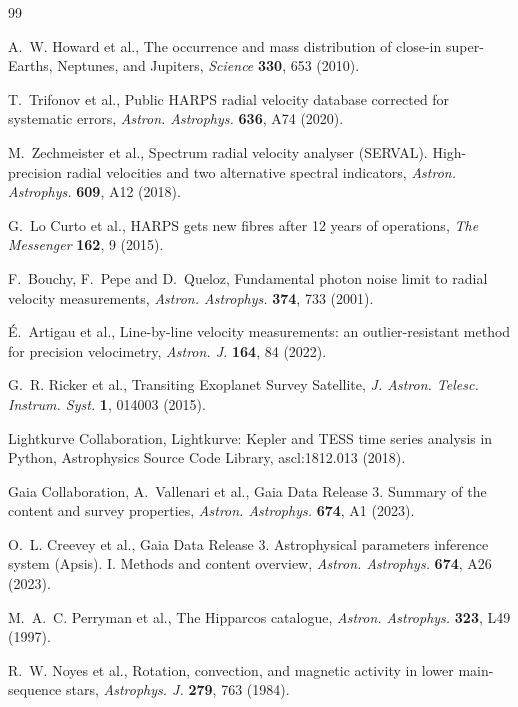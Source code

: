 \documentclass[3p,11pt]{elsarticle}
\begin{document}
\begin{thebibliography}{99}\small\raggedright
\setlength{\itemsep}{1pt}

A.~W. Howard et al., The occurrence and mass distribution of close-in super-Earths, Neptunes, and
Jupiters, \emph{Science} \textbf{330}, 653 (2010).

T.~Trifonov et al., Public HARPS radial velocity database corrected for systematic errors,
\emph{Astron. Astrophys.} \textbf{636}, A74 (2020).

M.~Zechmeister et al., Spectrum radial velocity analyser (SERVAL). High-precision radial velocities and
two alternative spectral indicators, \emph{Astron. Astrophys.} \textbf{609}, A12 (2018).

G.~Lo Curto et al., HARPS gets new fibres after 12 years of operations, \emph{The Messenger}
\textbf{162}, 9 (2015).

F.~Bouchy, F.~Pepe and D.~Queloz, Fundamental photon noise limit to radial velocity measurements,
\emph{Astron. Astrophys.} \textbf{374}, 733 (2001).

\'E.~Artigau et al., Line-by-line velocity measurements: an outlier-resistant method for precision
velocimetry, \emph{Astron. J.} \textbf{164}, 84 (2022).

G.~R. Ricker et al., Transiting Exoplanet Survey Satellite, \emph{J. Astron. Telesc. Instrum. Syst.}
\textbf{1}, 014003 (2015).

Lightkurve Collaboration, Lightkurve: Kepler and TESS time series analysis in Python, Astrophysics
Source Code Library, ascl:1812.013 (2018).

Gaia Collaboration, A.~Vallenari et al., Gaia Data Release 3. Summary of the content and survey
properties, \emph{Astron. Astrophys.} \textbf{674}, A1 (2023).

O.~L. Creevey et al., Gaia Data Release 3. Astrophysical parameters inference system (Apsis). I. Methods
and content overview, \emph{Astron. Astrophys.} \textbf{674}, A26 (2023).

M.~A.~C. Perryman et al., The Hipparcos catalogue, \emph{Astron. Astrophys.} \textbf{323}, L49 (1997).

R.~W. Noyes et al., Rotation, convection, and magnetic activity in lower main-sequence stars,
\emph{Astrophys. J.} \textbf{279}, 763 (1984).


\end{thebibliography}
\end{document}

